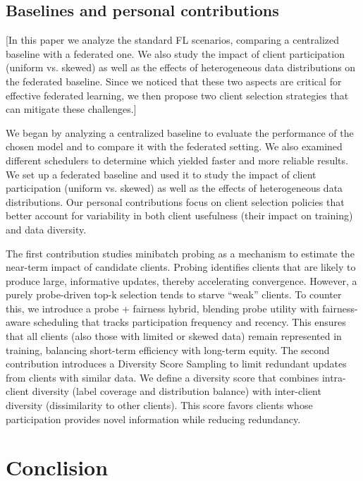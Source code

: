 \documentclass[10pt,twocolumn,letterpaper]{article}
\begin{document}
\subsection{Baselines and personal contributions}

[In this paper we analyze the standard FL scenarios, comparing a centralized baseline with a federated one. 
We also study the impact of client participation (uniform vs. skewed) as well as the effects of heterogeneous data distributions on the federated baseline.
Since we noticed that these two aspects are critical for effective federated learning, we then propose two client selection strategies that can mitigate these challenges.] 

We began by analyzing a centralized baseline to evaluate the performance of the chosen model and to compare it with the federated setting. We also examined different schedulers to determine which yielded faster and more reliable results.
We set up a federated baseline and used it to study the impact of client participation (uniform vs. skewed) as well as the effects of heterogeneous data distributions.
Our personal contributions focus on client selection policies that better account for variability in both client usefulness (their impact on training) and data diversity.

The first contribution studies minibatch probing as a mechanism to estimate the near-term impact of candidate clients. Probing identifies clients that are likely to produce large, informative updates, thereby accelerating convergence. However, a purely probe-driven top-k selection tends to starve “weak” clients. To counter this, we introduce a probe + fairness hybrid, blending probe utility with fairness-aware scheduling that tracks participation frequency and recency. This ensures that all clients (also those with limited or skewed data) remain represented in training, balancing short-term efficiency with long-term equity.
The second contribution introduces a Diversity Score Sampling to limit redundant updates from clients with similar data. We define a diversity score that combines intra-client diversity (label coverage and distribution balance) with inter-client diversity (dissimilarity to other clients). This score favors clients whose participation provides novel information while reducing redundancy.





\section{Conclision}
\end{document}
